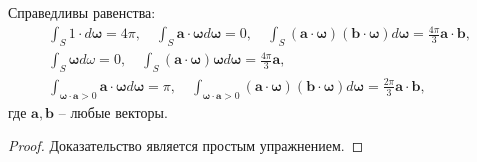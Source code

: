 \begin{lemma}
    \label{lm:1:1}
    Справедливы равенства:
    \[
        \begin{gathered}
            \int_{S} 1 \cdot d \boldsymbol{\omega}=4 \pi, \quad \int_{S} \mathbf{a}
            \cdot \boldsymbol{\omega} d \boldsymbol{\omega}=0,
            \quad \int_{S}(\mathbf{a} \cdot \boldsymbol{\omega})(\mathbf{b} \cdot \boldsymbol{\omega}) d
            \boldsymbol{\omega}=\frac{4 \pi}{3} \mathbf{a} \cdot \mathbf{b}, \\
            \int_{S} \boldsymbol{\omega} d \omega=0,
            \quad \int_{S}(\mathbf{a} \cdot \boldsymbol{\omega}) \boldsymbol{\omega} d
            \boldsymbol{\omega}=\frac{4 \pi}{3} \mathbf{a}, \\
            \int_{\boldsymbol{\omega} \cdot \mathbf{a}>0} \mathbf{a} \cdot \boldsymbol{\omega} d
            \boldsymbol{\omega}=\pi, \quad \int_{\boldsymbol{\omega} \cdot \mathbf{a}>0}(\mathbf{a} \cdot
            \boldsymbol{\omega})(\mathbf{b} \cdot \boldsymbol{\omega}) d \boldsymbol{\omega}
            = \frac{2 \pi}{3} \mathbf{a} \cdot \mathbf{b},
        \end{gathered}
    \]
    где $\mathbf{a}, \mathbf{b}$ -- любые векторы.
\end{lemma}
\begin{proof} Доказательство является простым упражнением.\end{proof}
%
%
%
